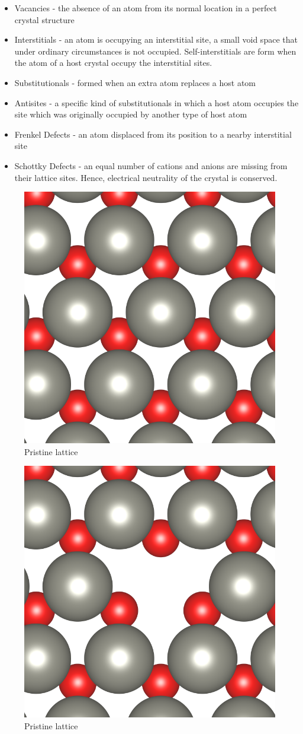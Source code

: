 \begin{itemize}
	\item Vacancies - the absence of an atom from its normal location in a perfect crystal structure
	\item Interstitials - an atom is occupying an interstitial site, a small void space that under ordinary circumstances is not occupied. Self-interstitials are form when the atom of a host crystal occupy the interstitial sites.
	\item Substitutionals - formed when an extra atom replaces a host atom
	\item Antisites - a specific kind of substitutionals in which a host atom occupies the site which was originally occupied by another type of host atom
	\item Frenkel Defects - an atom displaced from its position to a nearby interstitial site
	\item Schottky Defects - an equal  number  of  cations  and anions  are missing  from  their  lattice  sites. Hence,  electrical  neutrality  of  the  crystal is conserved.

\end{itemize}

\begin{figure}[tbh!]
	\centering
	\includegraphics[width=0.48\linewidth]{"images/rrl/perfect"}
	\caption[Pristine lattice]{Pristine lattice}
	\label{fig:perfectme}
\end{figure}

\begin{figure}[tbh!]
	\centering
	\includegraphics[width=0.48\linewidth]{"images/rrl/vacancy"}
	\caption[Pristine lattice]{Pristine lattice}
\end{figure}

